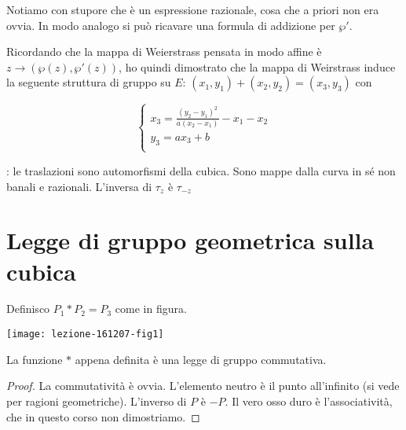 Notiamo con stupore che è un espressione razionale, cosa che a priori non era ovvia.
In modo analogo si può ricavare una formula di addizione per $\wp'$.

\begin{osservazione}
Ricordando che la mappa di Weierstrass pensata in modo affine è $z \rightarrow (\wp(z),\wp'(z))$, ho quindi dimostrato che la mappa di Weirstrass induce la seguente struttura di gruppo su $E$:
$(x_1,y_1) + (x_2,y_2) = (x_3,y_3)$ con

\begin{displaymath}
  \left\{
    \begin{array}{l}
      x_3 = \frac{(y_2-y_1)^2}{a(x_2-x_1)} - x_1 - x_2 \\
      y_3 = ax_3 + b \\
    \end{array}
  \right.
\end{displaymath}
\end{osservazione}

\begin{osservazione}: le traslazioni sono automorfismi della cubica. Sono mappe dalla curva in sé non banali e razionali.
L'inversa di $\tau_z$ è $\tau_{-z}$
\end{osservazione}


\section{Legge di gruppo geometrica sulla cubica}
Definisco $P_1 * P_2 = P_3$ come in figura.
\begin{center}
  \texttt{[image: lezione-161207-fig1]}
\end{center}



\begin{proposizione}
La funzione $*$ appena definita è una legge di gruppo commutativa.
\end{proposizione}
\begin{proof}
La commutatività è ovvia.
L'elemento neutro è il punto all'infinito (si vede per ragioni geometriche).
L'inverso di $P$ è $-P$.
Il vero osso duro è l'associatività, che in questo corso non dimostriamo.
\end{proof}

